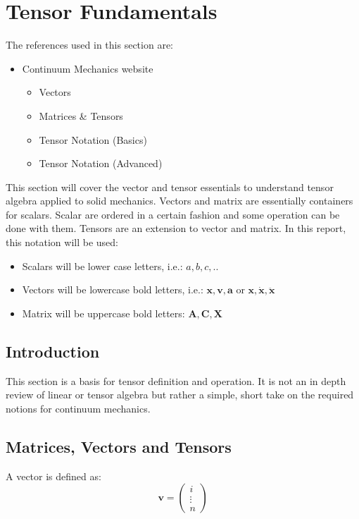 \section{Tensor Fundamentals}
\label{sec:tensorfundamentals}
\begin{sectionref}
The references used in this section are:
    \begin{itemize}
        \item Continuum Mechanics website \cite{McGinty}
        \begin{itemize}
            \item Vectors
            \item Matrices \& Tensors
            \item Tensor Notation (Basics)
            \item Tensor Notation (Advanced)
        \end{itemize}
    \end{itemize}
\end{sectionref}
This section will cover the vector and tensor essentials to understand tensor algebra applied to solid mechanics. Vectors and matrix are essentially containers for scalars. Scalar are ordered in a certain fashion and some operation can be done with them. Tensors are an extension to vector and matrix. In this report, this notation will be used:
\begin{itemize}
    \item Scalars will be lower case letters, i.e.: $a,b,c,..$
    \item Vectors will be lowercase bold letters, i.e.: $\boldsymbol{x,v,a}$ or $\boldsymbol{x, \dot{x}, \ddot{x}}$
    \item Matrix will be uppercase bold letters: $\boldsymbol{A, C, X}$
\end{itemize}

\subsection{Introduction}
This section is a basis for tensor definition and operation. It is not an in depth review of linear or tensor algebra but rather a simple, short take on the required notions for continuum mechanics.

\subsection{Matrices, Vectors and Tensors}
A vector is defined as:
$$ 
    \boldsymbol{v} = 
    \begin{pmatrix}
        i \\
        \vdots \\
        n
    \end{pmatrix}    
$$

